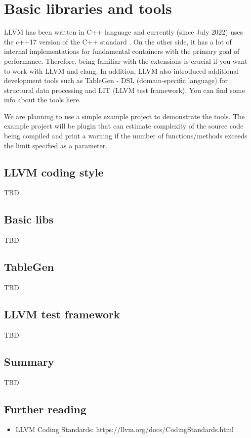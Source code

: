 \chapter{Basic libraries and tools}
\pagestyle{fancy}
\fancyhf{}
\rhead{\thepage}
LLVM has been written in C++ language and currently (since July 2022) uses the
c++17 version of the C++ standard \citep{llvm:cpp17migration}. On the other side,
it has a lot of internal implementations for fundamental containers with the
primary goal of performance. Therefore, being familiar with the extensions is
crucial if you want to work with LLVM and clang. In addition, LLVM also
introduced additional development tools such as TableGen - DSL (domain-specific
language) for structural data processing and LIT (LLVM test framework). You can
find some info about the tools here. 

We are planning to use a simple example project to demonstrate the tools. The
example project will be \clang plugin that can estimate complexity of
the source code being compiled and print a warning if the number of
functions/methods exceeds the limit specified as a parameter.  

\section{LLVM coding style}
TBD

\section{Basic libs}
TBD

\section{TableGen}
TBD

\section{LLVM test framework}
\label{sec:LLVMTest}
TBD

\section{Summary}
TBD

\section{Further reading}
\begin{itemize}
\item LLVM Coding Standards: https://llvm.org/docs/CodingStandards.html \citep{llvm:coding_standards}
\end{itemize}

